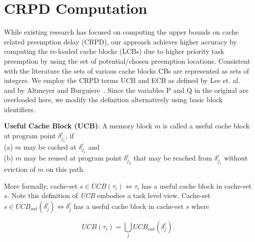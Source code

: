 \section{CRPD Computation}\label{sec:crpd_computation}

While existing research has focused on computing the upper bounds on cache related preemption delay (CRPD), our approach achieves higher accuracy by computing the re-loaded cache blocks (LCBs) due to higher priority task preemption by using the set of potential/chosen preemption locations.  Consistent with the literature the sets of various cache blocks CBs are represented as sets of integers.  We employ the CRPD terms UCB and ECB as defined by Lee et. al.~\cite{lee:98} and by Altmeyer and Burguiere~\cite{altmeyer:11c}.  Since the variables P and Q in the original are overloaded here, we modify the definition alternatively using basic block identifiers.

\begin{definition}
\textbf{Useful Cache Block (UCB)}: A memory block $m$ is called a useful cache block at program point \begin{math}\delta_{j_{1}}^{i}\end{math}, if \\(a) $m$ may be cached at \begin{math}\delta_{j_{1}}^{i}\end{math} and \\(b) $m$ may be reused at program point \begin{math}\delta_{j_{2}}^{i}\end{math} that may be reached from \begin{math}\delta_{j_{1}}^{i}\end{math} without eviction of $m$ on this path.
\end{definition}

\noindent More formally, cache-set \begin{math}s \in \textit{UCB}(\tau_{i}) \Leftrightarrow \tau_{i}\end{math} has a useful cache block in cache-set $s$.  Note this definition of \textit{UCB} embodies a task level view.  Cache-set \begin{math}s \in \textit{UCB}_{out}(\delta_{j}^{i}) \Leftrightarrow \delta_{j}^{i}\end{math} has a useful cache block in cache-set $s$ where

\begin{equation}\label{eqn:ucb-task}
    \textit{UCB}(\tau_{i}) = \bigcup_{j} \textit{UCB}_{out}(\delta_{j}^{i}).
\end{equation}

